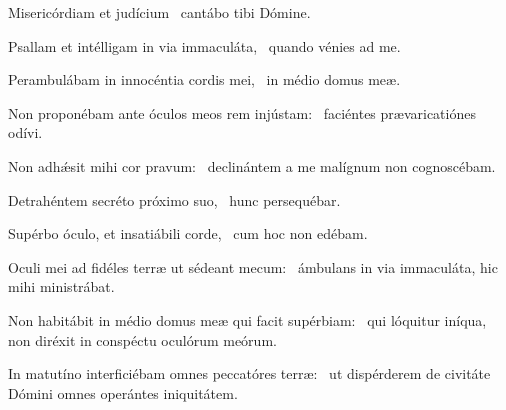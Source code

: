 \item Misericórdiam et judícium~\psstar{} cantábo tibi Dómine.

\item Psallam et intélligam in via immaculáta,~\psstar{} quando vénies ad me.

\item Perambulábam in innocéntia cordis mei,~\psstar{} in médio domus meæ.

\item Non proponébam ante óculos meos rem injústam:~\psstar{} faciéntes prævaricatiónes odívi.

\item Non adhǽsit mihi cor pravum:~\psstar{} declinántem a me malígnum non cognoscébam.

\item Detrahéntem secréto próximo suo,~\psstar{} hunc persequébar.

\item Supérbo óculo, et insatiábili corde,~\psstar{} cum hoc non edébam.

\item Oculi mei ad fidéles terræ ut sédeant mecum:~\psstar{} ámbulans in via immaculáta, hic mihi ministrábat.

\item Non habitábit in médio domus meæ qui facit supérbiam:~\psstar{} qui lóquitur iníqua, non diréxit in conspéctu oculórum meórum.

\item In matutíno interficiébam omnes peccatóres terræ:~\psstar{} ut dispérderem de civitáte Dómini omnes operántes iniquitátem.